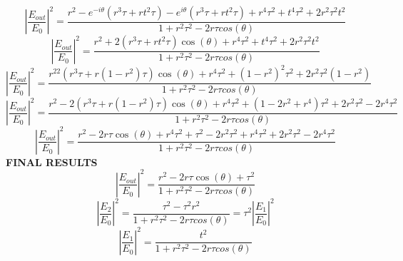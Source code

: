 %
\begin{equation}
\left |\frac{E_{out}}{E_{0}}\right|^2=\frac{r^2-e^{-i\theta}(r^3\tau+rt^2\tau)-e^{i\theta}(r^3\tau+rt^2\tau)+r^4\tau^2+t^4\tau^2+2r^2\tau^2t^2}{1+r^2\tau^2-2r\tau cos(\theta)}
\end{equation}
%
\begin{equation}
\left |\frac{E_{out}}{E_{0}}\right|^2=\frac{r^2+2(r^3\tau+rt^2\tau)\cos(\theta)+r^4\tau^2+t^4\tau^2+2r^2\tau^2t^2}{1+r^2\tau^2-2r\tau cos(\theta)}
\end{equation}
%
\begin{equation}
\left |\frac{E_{out}}{E_{0}}\right|^2=\frac{r^22(r^3\tau+r(1-r^2)\tau)\cos(\theta)+r^4\tau^2+(1-r^2)^2\tau^2+2r^2\tau^2(1-r^2)}{1+r^2\tau^2-2r\tau cos(\theta)}
\end{equation}
%
\begin{equation}
\left |\frac{E_{out}}{E_{0}}\right|^2=\frac{r^2-2(r^3\tau+r(1-r^2)\tau)\cos(\theta)+r^4\tau^2+(1-2r^2+r^4)\tau^2+2r^2\tau^2-2r^4\tau^2}{1+r^2\tau^2-2r\tau cos(\theta)}
\end{equation}
%
\begin{equation}
\left |\frac{E_{out}}{E_{0}}\right|^2=\frac{r^2-2r\tau\cos(\theta)+r^4\tau^2+\tau^2-2r^2\tau^2+r^4\tau^2+2r^2\tau^2-2r^4\tau^2}{1+r^2\tau^2-2r\tau cos(\theta)}
\end{equation}
%
\bf{FINAL RESULTS}
\begin{equation}
\left |\frac{E_{out}}{E_{0}}\right|^2=\frac{r^2-2r\tau\cos(\theta)+\tau^2}{1+r^2\tau^2-2r\tau cos(\theta)}
\end{equation}
\begin{equation}
\left |\frac{E_{2}}{E_{0}}\right |^2=\frac{\tau^2-\tau^2r^2}{1+r^2\tau^2-2r\tau cos(\theta)}=\tau^2\left|\frac{E_{1}}{E_{0}}\right |^2
\end{equation}
\begin{equation}
\left|\frac{E_{1}}{E_{0}}\right |^2=\frac{t^2}{1+r^2\tau^2-2r\tau cos(\theta)}
\end{equation}